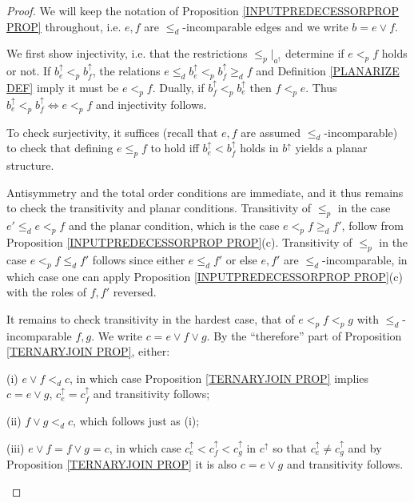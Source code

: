 \documentclass[a4paper,10pt]{article}%
\begin{document}
\begin{proof}
We will keep the notation of Proposition \ref{INPUTPREDECESSORPROP PROP} throughout,
i.e. $e, f$ are $\leq_d$-incomparable edges and we write $b = e \vee f$. 

	We first show injectivity,
	i.e. that the restrictions $\leq_p|_{a^{\uparrow}}$ determine if 
	$e <_p f$ holds or not.
If $b^{\uparrow}_e <_p b^{\uparrow}_f$, the relations
$e \leq_d b^{\uparrow}_e <_p b^{\uparrow}_f \geq_d f$
and Definition \ref{PLANARIZE DEF} imply it must be $e <_p f$.
Dually, if $b^{\uparrow}_f <_p b^{\uparrow}_e$ then 
$f <_p e$. Thus 
$b^{\uparrow}_e <_p b^{\uparrow}_f \Leftrightarrow e <_p f$ and injectivity follows.

To check surjectivity, 
 it suffices (recall that $e,f$ are assumed $\leq_d$-incomparable) to check that
defining $e \leq_p f$ to hold iff $b^{\uparrow}_e < b^{\uparrow}_f$ holds in $b^{\uparrow}$ yields a planar structure.

Antisymmetry and the total order conditions are immediate, and it thus remains to check the transitivity and planar conditions.
Transitivity of $\leq_p$ in the case $e' \leq_d e <_p f$ and the planar condition, which is the case $e <_p f \geq_d f'$, follow from Proposition \ref{INPUTPREDECESSORPROP PROP}(c). Transitivity of $\leq_p$ in the case $e <_p f \leq_d f'$
follows since either $e \leq_d f'$ or else $e,f'$ are $\leq_d$-incomparable, in which case one can apply Proposition \ref{INPUTPREDECESSORPROP PROP}(c) with the roles of $f,f'$ reversed.

It remains to check transitivity in the hardest case, that of 
$e <_p f <_p g$ with $\leq_d$-incomparable $f,g$.
We write $c = e \vee f \vee g$.
By the ``therefore'' part of Proposition \ref{TERNARYJOIN PROP}, either:
\begin{inparaenum}
	\item[(i)] $e \vee f <_d c$, in which case 
	Proposition \ref{TERNARYJOIN PROP}
	implies 
	$c=e \vee g$,
	$c^{\uparrow}_e = c^{\uparrow}_f$ and transitivity follows;
	\item[(ii)] $f \vee g <_d c$, which follows just as (i);
	\item[(iii)]  
$e \vee f = f \vee g =c$, in which case 
$c^{\uparrow}_e <
c^{\uparrow}_f <
c^{\uparrow}_g $ in $c^{\uparrow}$
so that $c^{\uparrow}_e \neq c^{\uparrow}_g$ and by Proposition \ref{TERNARYJOIN PROP} it is also 
$c = e \vee g$ and transitivity follows.
\end{inparaenum}
\end{proof}
\end{document}
